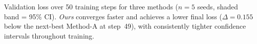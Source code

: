 \caption{Validation loss over 50 training steps for three methods ($n{=}5$ seeds, shaded band = 95\% CI). \emph{Ours} converges faster and achieves a lower final loss ($\Delta{=}0.155$ below the next-best Method-A at step~49), with consistently tighter confidence intervals throughout training.}
